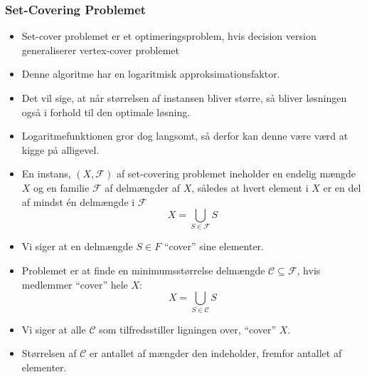 \begin{frame}[allowframebreaks]
	\frametitle{Set-Covering Problemet}
	\begin{itemize}
		\item Set-cover problemet er et optimeringsproblem, hvis decision version generaliserer vertex-cover problemet
		\item Denne algoritme har en logaritmisk approksimationsfaktor.
		\item Det vil sige, at når størrelsen af instansen bliver større, så bliver løsningen også i forhold til den optimale løsning.
		\item Logaritmefunktionen gror dog langsomt, så derfor kan denne være værd at kigge på alligevel.
		\item En instans, $(X, \mathcal{F})$ af set-covering problemet ineholder en endelig mængde $X$ og en familie $\mathcal{F}$ af delmængder af $X$, således at hvert element i $X$ er en del af mindst én delmængde i $\mathcal{F}$
		      \begin{equation*}
			      X = \bigcup_{S \in \mathcal{F}} S
		      \end{equation*}
		\item Vi siger at en delmængde $S \in F$ ``cover'' sine elementer.
		\item Problemet er at finde en minimumsstørrelse delmængde $\mathcal{C} \subseteq \mathcal{F}$, hvis medlemmer ``cover'' hele $X$:
		      \begin{equation*}
			      X = \bigcup_{S \in \mathcal{C}} S
		      \end{equation*}
	  \item Vi siger at alle $\mathcal{C}$ som tilfredsstiller ligningen over, ``cover'' $X$.
	  \item Størrelsen af $\mathcal{C}$ er antallet af mængder den indeholder, fremfor antallet af elementer.
	\end{itemize}
\end{frame}

